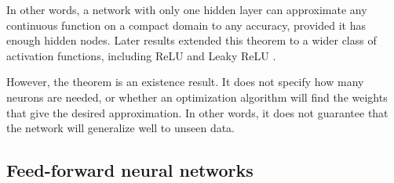 \documentclass[amssymb,secnumarabic,twocolumn,aps]{revtex4}
\begin{document}
In other words, a network with only one hidden layer can approximate any continuous function on a compact domain to any accuracy, provided it has enough hidden nodes. Later results extended this theorem to a wider class of activation functions, including ReLU and Leaky ReLU \cite{lecturebook}.

However, the theorem is an existence result. It does not specify how many neurons are needed, or whether an optimization algorithm will find the weights that give the desired approximation. In other words, it does not guarantee that the network will generalize well to unseen data.

\subsection{Feed-forward neural networks}
\end{document}
